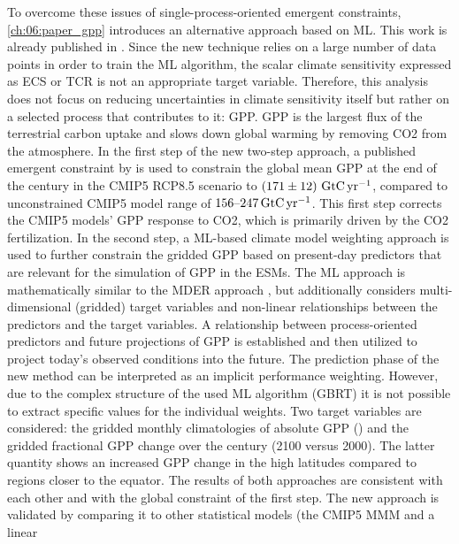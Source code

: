 To overcome these issues of single-process-oriented emergent constraints,
\cref{ch:06:paper_gpp} introduces an alternative approach based on \ac{ML}.
This work is already published in \textcite{Schlund2020}. Since the new
technique relies on a large number of data points in order to train the \ac{ML}
algorithm, the scalar climate sensitivity expressed as \ac{ECS} or \ac{TCR} is
not an appropriate target variable. Therefore, this analysis does not focus on
reducing uncertainties in climate sensitivity itself but rather on a selected
process that contributes to it: \ac{GPP}. \Ac{GPP} is the largest flux of the
terrestrial carbon uptake and slows down global warming by removing \ac{CO2}
from the atmosphere. In the first step of the new two-step approach, a
published emergent constraint by \textcite{Wenzel2016} is used to constrain the
global mean \ac{GPP} at the end of the  century in the \acs{CMIP}5
\acs{RCP}8.5 scenario to $\pmrangeunit{171}{12}{\GtCyr{}}$, compared to
unconstrained \acs{CMIP}5 model range of $\rangeunit{156}{247}{\GtCyr{}}$. This
first step corrects the \acs{CMIP}5 models' \ac{GPP} response to \ac{CO2},
which is primarily driven by the \ac{CO2} fertilization. In the second step, a
\ac{ML}-based climate model weighting approach is used to further constrain the
gridded \ac{GPP} based on present-day predictors that are relevant for the
simulation of \ac{GPP} in the \acp{ESM}. The \ac{ML} approach is mathematically
similar to the \ac{MDER} approach \autocite{Karpechko2013, Senftleben2020,
  Wenzel2016a}, but additionally considers multi-dimensional (gridded) target
variables and non-linear relationships between the predictors and the target
variables. A relationship between process-oriented predictors and future
projections of \ac{GPP} is established and then utilized to project today's
observed conditions into the future. The prediction phase of the new method can
be interpreted as an implicit performance weighting. However, due to the
complex structure of the used \ac{ML} algorithm (\ac{GBRT}) it is not possible
to extract specific values for the individual weights. Two target variables are
considered: the gridded monthly climatologies of absolute \ac{GPP}
() and the gridded fractional \ac{GPP} change over the
 century (2100 versus 2000). The latter quantity shows an increased
\acs{GPP} change in the high latitudes compared to regions closer to the
equator. The results of both approaches are consistent with each other and with
the global constraint of the first step. The new approach is validated by
comparing it to other statistical models (the \acs{CMIP}5 \ac{MMM} and a linear
